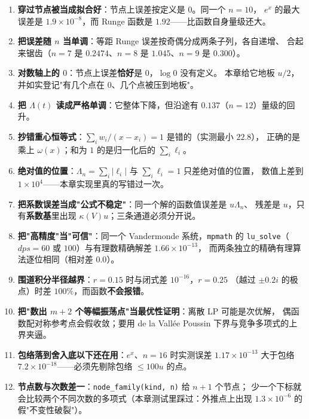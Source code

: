 \begin{enumerate}
  \item \textbf{穿过节点被当成拟合好}：节点上误差按定义是 $0$。同一个 $n=10$，
        $e^x$ 的最大误差是 $1.9\times10^{-8}$，而 Runge 函数是 $1.92$——比函数自身量级还大。
  \item \textbf{把误差随 $n$ 当单调}：等距 Runge 误差按奇偶分成两条子列，各自递增、
        合起来锯齿（$n=7$ 是 $0.2474$、$n=8$ 是 $1.045$、$n=9$ 是 $0.300$）。
  \item \textbf{对数轴上的 $0$}：节点上误差\textbf{恰好}是 $0$，$\log0$ 没有定义。
        本章给它地板 $u/2$，并如实登记"有几个点在 $0$、几个点被压到地板"。
  \item \textbf{把 $\Lambda(t)$ 读成严格单调}：它整体下降，但沿途有 $0.137$（$n=12$）量级的回升。
  \item \textbf{抄错重心恒等式}：$\sum_iw_i/(x-x_i)=1$ 是错的（实测最小 $22.8$），
        正确的是乘上 $\omega(x)$；和为 $1$ 的是归一化后的 $\sum_i\ell_i$。
  \item \textbf{绝对值的位置}：$\Lambda_n=\sum_i|\ell_i|$ 与 $\sum_i\ell_i=1$ 只差绝对值的位置，
        数值上差到 $1\times10^{4}$——本章实现里真的写错过一次。
  \item \textbf{把系数误差当成"公式不稳定"}：同一个解的函数值误差是 $u\Lambda_n$、
        残差是 $u$，只有\textbf{系数基}里出现 $\kappa(V)u$；三条通道必须分开说。
  \item \textbf{把"高精度"当"可信"}：同一个 Vandermonde 系统，\texttt{mpmath} 的
        \texttt{lu\_solve}（$dps=60$ 或 $100$）与有理数精确解差 $1.66\times10^{-13}$，
        而两条独立的精确有理算法逐位相同（相对差 $0.0$）。
  \item \textbf{围道积分半径越界}：$r=0.15$ 时与闭式差 $10^{-16}$，$r=0.25$
        （越过 $\pm0.2i$ 的极点）时差 $100\%$，而函数\textbf{不会报错}。
  \item \textbf{把"数出 $m+2$ 个等幅振荡点"当最优性证明}：离散 LP 可能是次优解，
        偶函数配对称参考点会假收敛；要用 de la Vall\'ee Poussin 下界与竞争多项式的上界夹逼。
  \item \textbf{包络落到舍入底以下还在用}：$e^x$、$n=16$ 时实测误差 $1.17\times10^{-13}$
        大于包络 $7.2\times10^{-18}$——必须先剔除包络 $\le100u$ 的点。
  \item \textbf{节点数与次数差一}：\texttt{node\_family(kind, n)} 给 $n+1$ 个节点；
        少一个下标就会比较两个不同次数的多项式（本章测试里踩过：外推点上出现
        $1.3\times10^{-6}$ 的假"不变性破裂"）。
\end{enumerate}
